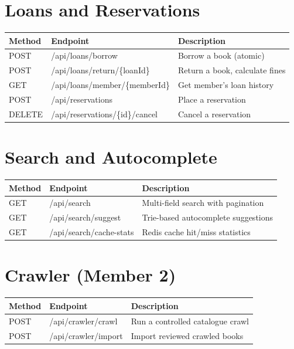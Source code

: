 \documentclass[12pt,a4paper]{report}
\begin{document}
\section{Loans and Reservations}
\begin{table}[H]
\centering
\begin{tabularx}{\textwidth}{l l X}
\toprule
\textbf{Method} & \textbf{Endpoint} & \textbf{Description} \\
\midrule
POST & /api/loans/borrow & Borrow a book (atomic) \\
POST & /api/loans/return/\{loanId\} & Return a book, calculate fines \\
GET & /api/loans/member/\{memberId\} & Get member's loan history \\
POST & /api/reservations & Place a reservation \\
DELETE & /api/reservations/\{id\}/cancel & Cancel a reservation \\
\bottomrule
\end{tabularx}
\end{table}

\section{Search and Autocomplete}
\begin{table}[H]
\centering
\begin{tabularx}{\textwidth}{l l X}
\toprule
\textbf{Method} & \textbf{Endpoint} & \textbf{Description} \\
\midrule
GET & /api/search & Multi-field search with pagination \\
GET & /api/search/suggest & Trie-based autocomplete suggestions \\
GET & /api/search/cache-stats & Redis cache hit/miss statistics \\
\bottomrule
\end{tabularx}
\end{table}

\section{Crawler (Member 2)}
\begin{table}[H]
\centering
\begin{tabularx}{\textwidth}{l l X}
\toprule
\textbf{Method} & \textbf{Endpoint} & \textbf{Description} \\
\midrule
POST & /api/crawler/crawl & Run a controlled catalogue crawl \\
POST & /api/crawler/import & Import reviewed crawled books \\
\bottomrule
\end{tabularx}
\end{table}
\end{document}
